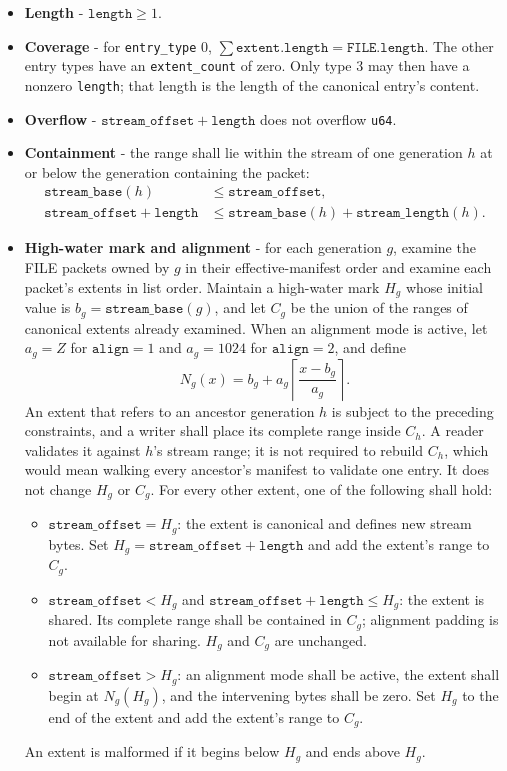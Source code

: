 \documentclass[10pt,a4paper]{report}
\begin{document}
\begin{itemize}
\item
  \textbf{Length} - $\mathtt{length}\ge1$.
\item
  \textbf{Coverage} - for \verb|entry_type| 0,
  $\sum\mathtt{extent.length}=\mathtt{FILE.length}$. The other entry types have
  an \verb|extent_count| of zero. Only type 3 may then have a nonzero
  \verb|length|; that length is the length of the canonical entry's content.
\item
  \textbf{Overflow} - $\mathtt{stream\_offset}+\mathtt{length}$ does not
  overflow \verb|u64|.
\item
  \textbf{Containment} - the range shall lie within the stream of one
  generation $h$ at or below the generation containing the packet:
  \begin{align*}
  \mathtt{stream\_base}(h)&\le\mathtt{stream\_offset},\\
  \mathtt{stream\_offset}+\mathtt{length}
    &\le\mathtt{stream\_base}(h)+\mathtt{stream\_length}(h).
  \end{align*}
\item
  \textbf{High-water mark and alignment} - for each generation $g$, examine the
  FILE packets owned by $g$ in their effective-manifest order and examine each
  packet's extents in list order. Maintain a high-water mark $H_g$ whose
  initial value is $b_g=\mathtt{stream\_base}(g)$, and let $C_g$ be the union of
  the ranges of canonical extents already examined. When an alignment mode is
  active, let $a_g=Z$ for $\mathtt{align}=1$ and $a_g=1024$ for
  $\mathtt{align}=2$, and define
  \[
    N_g(x)=b_g+a_g\left\lceil\frac{x-b_g}{a_g}\right\rceil .
  \]
  An extent that refers to an ancestor generation $h$ is subject to the
  preceding constraints, and a writer shall place its complete range inside
  $C_h$. A reader validates it against $h$'s stream range; it is not required
  to rebuild $C_h$, which would mean walking every ancestor's manifest to
  validate one entry. It does not change $H_g$ or $C_g$. For every other extent, one of the following
  shall hold:

  \begin{itemize}
  \item
    $\mathtt{stream\_offset}=H_g$: the extent is canonical and defines new
    stream bytes. Set $H_g=\mathtt{stream\_offset}+\mathtt{length}$ and add the
    extent's range to $C_g$.
  \item
    $\mathtt{stream\_offset}<H_g$ and
    $\mathtt{stream\_offset}+\mathtt{length}\le H_g$: the extent is shared. Its
    complete range shall be contained in $C_g$; alignment padding is not
    available for sharing. $H_g$ and $C_g$ are unchanged.
  \item
    $\mathtt{stream\_offset}>H_g$: an alignment mode shall be active, the
    extent shall begin at $N_g(H_g)$, and the intervening bytes shall be zero.
    Set $H_g$ to the end of the extent and add the extent's range to $C_g$.
  \end{itemize}

  An extent is malformed if it begins below $H_g$ and ends above $H_g$.
\end{itemize}
\end{document}
